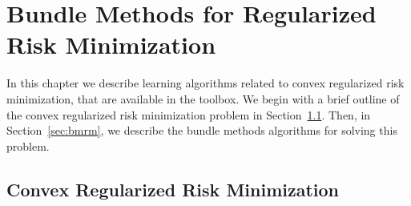 %

\def\##1{\relax\ifmmode\mathchoice      %
{\mbox{\boldmath$\displaystyle#1$}}
{\mbox{\boldmath$\textstyle#1$}}
{\mbox{\boldmath$\scriptstyle#1$}}
{\mbox{\boldmath$\scriptscriptstyle#1$}}\else
\hbox{\boldmath$\textstyle#1$}\fi}
\def\m#1{\mathbf{#1}}                  %
\def\Re{{\mathbb R}}
\def\calS{{\cal S}}
\def\calO{{\cal O}}
\def\SY{{\cal Y}}
\def\SX{{\cal X}}
\def\Na{{\cal N}}
\def\calI{{\cal I}}
\def\calX{{\cal X}}
\def\col{{\rm col}}
\def\lz{\langle}
\def\pz{\rangle}
\def\equ#1{(\ref{#1})}
\def\ass{\mathrel {:=}}
\def\argmax{\mathop{\rm argmax}}
\def\argmin{\mathop{\rm argmin}}
\def\veps{\varepsilon}

\chapter{Bundle Methods for Regularized Risk Minimization}

In this chapter we describe learning algorithms related to convex regularized risk minimization, that are available in the \shogun{} toolbox. We begin with a brief outline of the convex regularized risk minimization problem in Section~\ref{sec:crrm}. Then, in Section~\ref{sec:bmrm}, we describe the bundle methods algorithms for solving this problem.

\section{Convex Regularized Risk Minimization} \label{sec:crrm}

